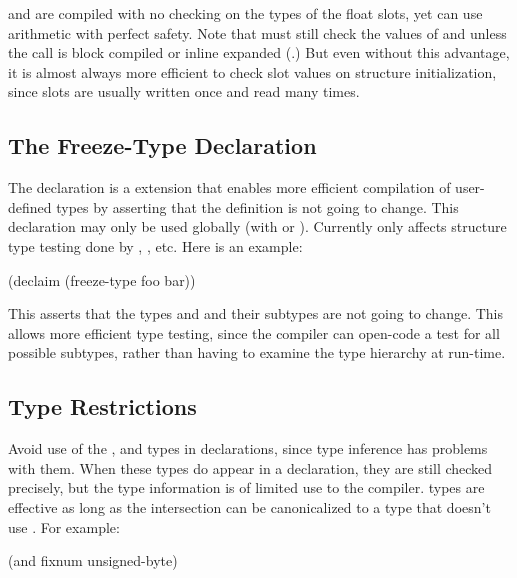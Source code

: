  and  are compiled with no checking on the
types of the float slots, yet  can use
 arithmetic with perfect safety.  Note that
 must still check the values of  and
 unless the call is block compiled or inline expanded
(.)  But even without this advantage, it is almost
always more efficient to check slot values on structure
initialization, since slots are usually written once and read many
times.


\subsection{The Freeze-Type Declaration}
\label{freeze-type}

The  declaration is a \cmucl{} extension that
enables more efficient compilation of user-defined types by asserting
that the definition is not going to change.  This declaration may only
be used globally (with  or ).  Currently
 only affects structure type testing done by
, , etc.  Here is an example:

\begin{lisp}
(declaim (freeze-type foo bar))
\end{lisp}

This asserts that the types  and  and their
subtypes are not going to change.  This allows more efficient type
testing, since the compiler can open-code a test for all possible
subtypes, rather than having to examine the type hierarchy at
run-time.


\subsection{Type Restrictions}

Avoid use of the ,  and  types in
declarations, since type inference has problems with them.  When these
types do appear in a declaration, they are still checked precisely,
but the type information is of limited use to the compiler.
 types are effective as long as the intersection can be
canonicalized to a type that doesn't use .  For example:

\begin{example}
(and fixnum unsigned-byte)
\end{example}

